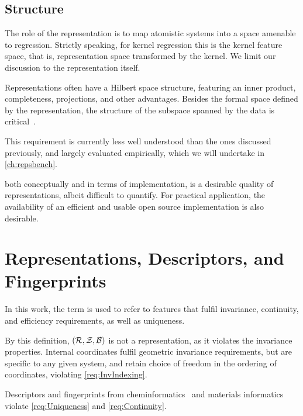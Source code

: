 \subsection{Structure}


The role of the representation is to map atomistic systems into a space amenable to regression.
Strictly speaking, for kernel regression this is the kernel feature space, that is, representation space transformed by the kernel.
We limit our discussion to the representation itself.


Representations often have a Hilbert space structure, featuring an inner product, completeness, projections, and other advantages.
Besides the formal space defined by the representation, the structure of the subspace spanned by the data is critical~\cite{pwcc2020q,gfic2021q}.

This requirement is currently less well understood than the ones discussed previously, and largely evaluated empirically, which we will undertake in \cref{ch:repsbench}.

 both conceptually and in terms of implementation, is a desirable quality of representations, albeit difficult to quantify. For practical application, the availability of an efficient and usable open source implementation is also desirable.

\section{Representations, Descriptors, and Fingerprints}


In this work, the term  is used to refer to features that fulfil invariance, continuity, and efficiency requirements, as well as uniqueness.

By this definition, $(\mathcal{R}, \mathcal{Z}, \mathcal{B})$ is not a representation, as it violates the invariance properties. Internal coordinates fulfil geometric invariance requirements, but are specific to any given system, and retain choice of freedom in the ordering of coordinates, violating \ref{req:InvIndexing}.

Descriptors and fingerprints from cheminformatics~\cite{todeschini2009} and materials informatics violate \ref{req:Uniqueness} and \ref{req:Continuity}.

